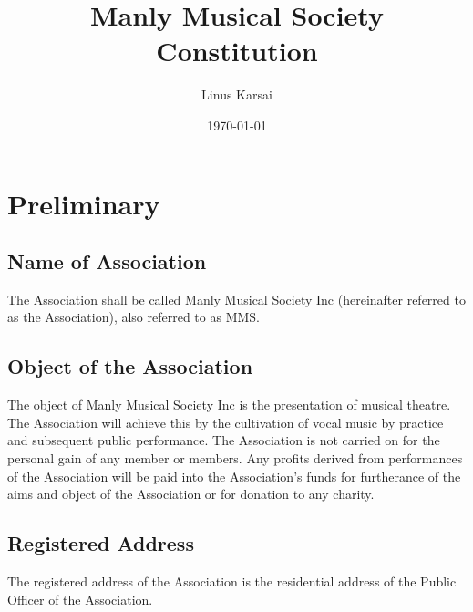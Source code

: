 \documentclass{article}
\title{Manly Musical Society Constitution}
\author{Linus Karsai}
\date{\today}
\begin{document}
\maketitle

\tableofcontents
\clearpage
\section{Preliminary}

\subsection{Name of Association}
The Association shall be called Manly Musical Society Inc (hereinafter referred to as the Association), also referred to as MMS.
\subsection{Object of the Association}
The object of Manly Musical Society Inc is the presentation of musical theatre.  The Association will achieve this by the cultivation of vocal music by practice and subsequent public performance.  The Association is not carried on for the personal gain of any member or members.  Any profits derived from performances of the Association will be paid into the Association’s funds for furtherance of the aims and object of the Association or for donation to any charity.
\subsection{Registered Address}
The registered address of the Association is the residential address of the Public Officer of the Association. 
\end{document}
